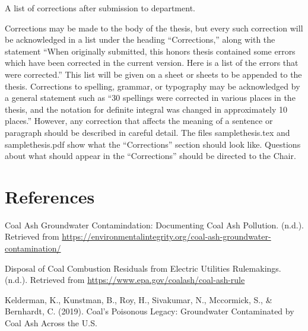 \documentclass[12pt, twoside]{amherstthesis}
\newlength{\cslhangindent}
\newenvironment{cslreferences}%
  {\setlength{\parindent}{0pt}%
  \everypar{\setlength{\hangindent}{\cslhangindent}}\ignorespaces}%
  {\par}
\begin{document}
A list of corrections after submission to department.

Corrections may be made to the body of the thesis, but every such correction will be acknowledged in a list under the heading ``Corrections,'' along with the statement ``When originally submitted, this honors thesis contained some errors which have been corrected in the current version. Here is a list of the errors that were corrected.'' This list will be given on a sheet or sheets to be appended to the thesis. Corrections to spelling, grammar, or typography may be acknowledged by a general statement such as ``30 spellings were corrected in various places in the thesis, and the notation for definite integral was changed in approximately 10 places.'' However, any correction that affects the meaning of a sentence or paragraph should be described in careful detail. The files samplethesis.tex and samplethesis.pdf show what the ``Corrections'' section should look like. Questions about what should appear in the ``Corrections'' should be directed to the Chair.

\backmatter

\hypertarget{references}{%
\chapter*{References}\label{references}}

\noindent

\setlength{\parindent}{-0.20in}
\setlength{\leftskip}{0.20in}
\setlength{\parskip}{8pt}

\hypertarget{refs}{}
\begin{cslreferences}
\leavevmode\hypertarget{ref-EIP2020}{}%
Coal Ash Groundwater Contamindation: Documenting Coal Ash Pollution. (n.d.). Retrieved from \url{https://environmentalintegrity.org/coal-ash-groundwater-contamination/}

\leavevmode\hypertarget{ref-Car2020}{}%
Disposal of Coal Combustion Residuals from Electric Utilities Rulemakings. (n.d.). Retrieved from \url{https://www.epa.gov/coalash/coal-ash-rule}

\leavevmode\hypertarget{ref-Kelderman2019}{}%
Kelderman, K., Kunstman, B., Roy, H., Sivakumar, N., Mccormick, S., \& Bernhardt, C. (2019). Coal's Poisonous Legacy: Groundwater Contaminated by Coal Ash Across the U.S.
\end{cslreferences}
\end{document}
